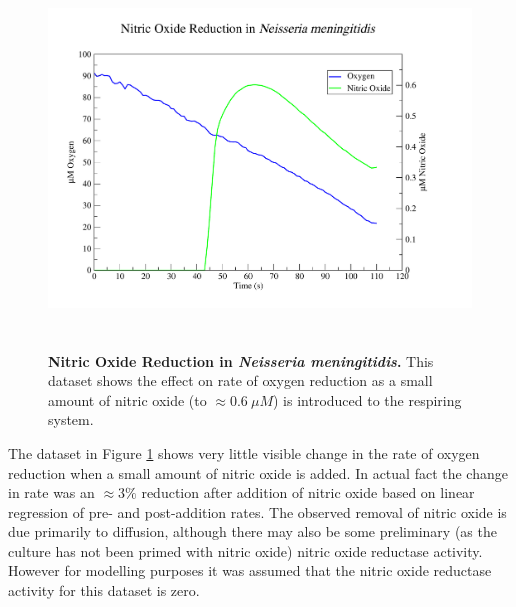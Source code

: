 \begin{figure}[tbp]
 \centering
 \includegraphics[height=10cm, trim=1cm 1cm 3cm 1cm, clip=true]{./06-noreduction/data/aer-no-data1.pdf}
 \caption[{Nitric Oxide Reduction in \textit{Neisseria meningitidis}.}]{{\bf Nitric Oxide Reduction in \textit{Neisseria meningitidis}.} This dataset shows the effect on rate of oxygen reduction as a small amount of nitric oxide (to $\approx 0.6~\mu M$) is introduced to the respiring system.}
 \label{fig:nodata1}
\end{figure}
The dataset in Figure \ref{fig:nodata1} shows very little visible change in the rate of oxygen reduction when a small amount of nitric oxide is added. In actual fact the change in rate was an $\approx 3\%$ reduction after addition of nitric oxide based on linear regression of pre- and post-addition rates. The observed removal of nitric oxide is due primarily to diffusion, although there may also be some preliminary (as the culture has not been primed with nitric oxide) nitric oxide reductase activity. However for modelling purposes it was assumed that the nitric oxide reductase activity for this dataset is zero.

